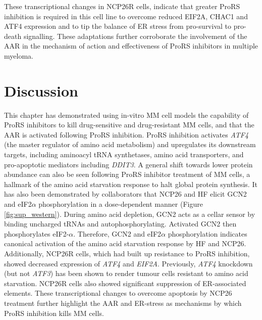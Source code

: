 These transcriptional changes in NCP26R cells, indicate that greater ProRS inhibition is required in this cell line to overcome reduced EIF2A, CHAC1 and ATF4 expression and to tip the balance of ER stress from pro-survival to pro-death signalling.
These adaptations further corroborate the involvement of the AAR in the mechanism of action and effectiveness of ProRS inhibitors in multiple myeloma.

%

\afterpage{\clearpage}
\section{Discussion}
This chapter has demonstrated using in-vitro MM cell models the capability of ProRS inhibitors to kill drug-sensitive and drug-resistant MM cells, and that the AAR is activated following ProRS inhibition.
ProRS inhibition activates \textit{ATF4} (the master regulator of amino acid metabolism) and upregulates its downstream targets, including aminoacyl tRNA synthetases, amino acid transporters, and pro-apoptotic mediators including \textit{DDIT3}.
A general shift towards lower protein abundance can also be seen following ProRS inhibitor treatment of MM cells, a hallmark of the amino acid starvation response to halt global protein synthesis.
It has also been demonstrated by collaborators that NCP26 and HF elicit GCN2 and eIF2$\alpha$ phosphorylation in a dose-dependent manner (Figure \ref{fig:sup_western}).
During amino acid depletion, GCN2 acts as a cellar sensor by binding uncharged tRNAs and autophosphorylating.
Activated GCN2 then phosphorylates eIF2-$\alpha$\cite{battu2017amino}.
Therefore, GCN2 and eIF2$\alpha$ phosphorylation indicates canonical activation of the amino acid starvation response by HF and NCP26.
Additionally, NCP26R cells, which had built up resistance to ProRS inhibition, showed decreased expression of \textit{ATF4}  and \textit{EIF2A}.
Previously, \textit{ATF4} knockdown (but not \textit{ATF3}) has been shown to render tumour cells resistant to amino acid starvation\cite{cheng2018arginine}.
NCP26R cells also showed significant suppression of ER-associated elements.
These transcriptional changes to overcome apoptosis by NCP26 treatment further highlight the AAR and ER-stress as mechanisms by which ProRS inhibition kills MM cells.

